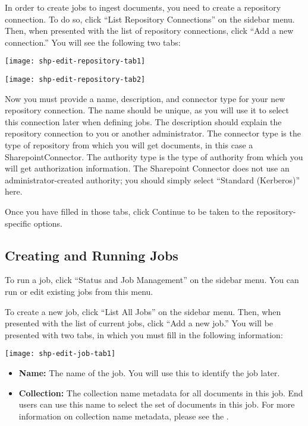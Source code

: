 \begin{changemargin}{1.5in}{0in}
In order to create jobs to ingest documents, you need to create a
repository connection. To do so, click ``List Repository
Connections'' on the sidebar menu. Then, when presented with the list
of repository connections, click ``Add a new connection.'' You will
see the following two tabs:

\texttt{[image: shp-edit-repository-tab1]}

\texttt{[image: shp-edit-repository-tab2]}







Now you must provide a name, description, and connector type for your
new repository connection. The name should be unique, as you will use
it to select this connection later when defining jobs. The description
should explain the repository connection to you or another
administrator.  The connector type is the type of repository from
which you will get documents, in this case a SharepointConnector. The
authority type is the type of authority from which you will get
authorization information. The Sharepoint Connector does not use an
administrator-created authority; you should simply select ``Standard
(Kerberos)'' here.

Once you have filled in those tabs, click Continue to be taken to the
repository-specific options.



\subsection{Creating and Running Jobs}

To run a job, click ``Status and Job Management'' on the sidebar menu.
You can run or edit existing jobs from this menu.

To create a new job, click ``List All Jobs'' on the sidebar menu. Then, when
presented with the list of current jobs, click ``Add a new job.'' You
will be presented with two tabs, in which you must fill in the following
information:

\texttt{[image: shp-edit-job-tab1]}

\begin{itemize}

\item \textbf{Name:} The name of the job. You will use this to identify
the job later.

\item \textbf{Collection:} The collection name metadata for all
documents in this job. End users can use this name to select the set
of documents in this job. For more information on collection name
metadata, please see the .


\end{itemize}
\end{changemargin}
